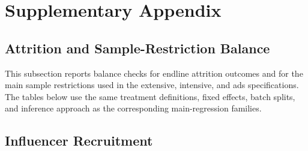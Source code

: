 \section{Supplementary Appendix}

\subsection{Attrition and Sample-Restriction Balance}
\label{app:attrition_balance}

This subsection reports balance checks for endline attrition outcomes and for the main sample restrictions used in the extensive, intensive, and ads specifications. The tables below use the same treatment definitions, fixed effects, batch splits, and inference approach as the corresponding main-regression families.


\newpage


\newpage


\newpage


\newpage


\newpage


\newpage

\subsection{Influencer Recruitment}
\label{app:inf_recruit}

